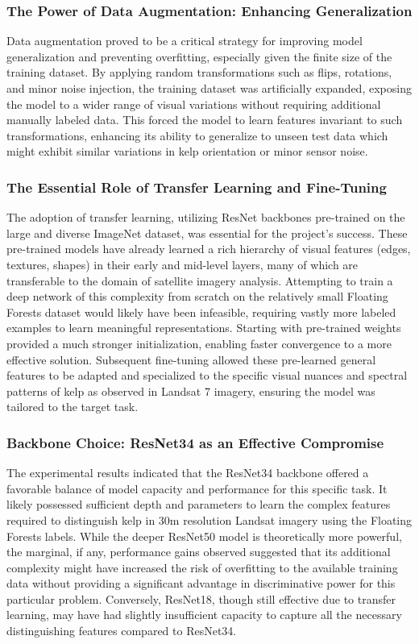 \documentclass{article}
\begin{document}
\subsubsection{The Power of Data Augmentation: Enhancing Generalization}

Data augmentation proved to be a critical strategy for improving model generalization and preventing overfitting, especially given the finite size of the training dataset. By applying random transformations such as flips, rotations, and minor noise injection, the training dataset was artificially expanded, exposing the model to a wider range of visual variations without requiring additional manually labeled data. This forced the model to learn features invariant to such transformations, enhancing its ability to generalize to unseen test data which might exhibit similar variations in kelp orientation or minor sensor noise. 

\subsubsection{The Essential Role of Transfer Learning and Fine-Tuning}

The adoption of transfer learning, utilizing ResNet backbones pre-trained on the large and diverse ImageNet dataset, was essential for the project's success. These pre-trained models have already learned a rich hierarchy of visual features (edges, textures, shapes) in their early and mid-level layers, many of which are transferable to the domain of satellite imagery analysis. Attempting to train a deep network of this complexity from scratch on the relatively small Floating Forests dataset would likely have been infeasible, requiring vastly more labeled examples to learn meaningful representations. Starting with pre-trained weights provided a much stronger initialization, enabling faster convergence to a more effective solution. Subsequent fine-tuning allowed these pre-learned general features to be adapted and specialized to the specific visual nuances and spectral patterns of kelp as observed in Landsat 7 imagery, ensuring the model was tailored to the target task.

\subsubsection{Backbone Choice: ResNet34 as an Effective Compromise}

The experimental results indicated that the ResNet34 backbone offered a favorable balance of model capacity and performance for this specific task. It likely possessed sufficient depth and parameters to learn the complex features required to distinguish kelp in 30m resolution Landsat imagery using the Floating Forests labels. While the deeper ResNet50 model is theoretically more powerful, the marginal, if any, performance gains observed suggested that its additional complexity might have increased the risk of overfitting to the available training data without providing a significant advantage in discriminative power for this particular problem. Conversely, ResNet18, though still effective due to transfer learning, may have had slightly insufficient capacity to capture all the necessary distinguishing features compared to ResNet34.
\end{document}
